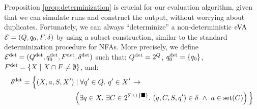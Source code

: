 Proposition \ref*{prop:determinization} is crucial for our evaluation algorithm,
given that we can simulate runs and construct the output, without worrying about
duplicates. Fortunately, we can always ``determinize'' a non-deterministic
$\mathrm{eVA}$ $\mathcal{E} = (Q, q_0, F, \delta)$ by using a subset construction, similar to
the standard determinization procedure for NFAs. More precisely, we define
$\mathcal{E}^{{\operatorname{det}}} = (Q^{{\operatorname{det}}}, q_0^{{\operatorname{det}}}, F^{{\operatorname{det}}}, \delta^{{\operatorname{det}}})$ such that:
$Q^{{\operatorname{det}}} = 2^Q$, $q_0^{{\operatorname{det}}} = \{q_0\}$, $F^{{\operatorname{det}}} = \{X \mid X \cap F \neq
\emptyset\}$, and:
\begin{align*}
	\delta^{{\operatorname{det}}} = \Big\{(X, a, S, X') &\mid \forall q' \in Q.\ q' \in X' \, \rightarrow\\ 
	&\left(\exists q \in X.\ \exists C \in 2^{\Sigma \; \cup \, \{\blacksquare\}}.\ (q, C, S, q') \in \delta\ \wedge\ a \in \operatorname{set}(C) \right) \Big\}
\end{align*}

